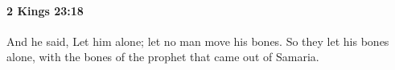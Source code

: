 
		\paragraph{2 Kings 23:18} %
			\label{2KINGS-23-18}

			And he said, Let him alone; let no man move his bones. So they let his bones alone, with the bones of the prophet that came out of Samaria.


